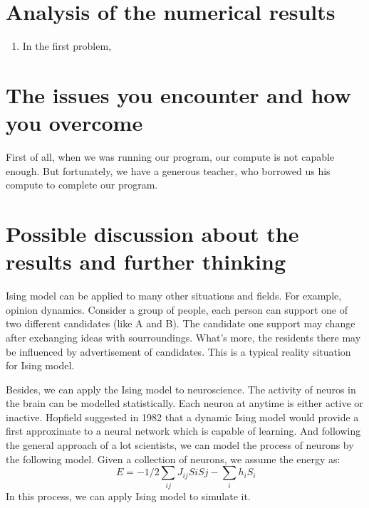\documentclass[11pt,openany]{book}              %
\begin{document}
\section{Analysis of the numerical results }
\begin{enumerate}
  \item In the first problem,
\end{enumerate}
\section{The issues you encounter and how you overcome }
First of all, when we was running our program, our compute is not capable enough. But fortunately, 
we have a generous teacher, who borrowed us his compute to complete our program.

\section{ Possible discussion about the results and further thinking }
Ising model can be applied to many other situations and fields. For example, opinion dynamics.
Consider a group of people, each person can support one of two different candidates (like A and B).
The candidate one support may change after exchanging ideas with sourroundings. 
What's more, the residents there may be influenced by advertisement of candidates. This is a typical
reality situation for Ising model.

Besides, we can apply the Ising model to neuroscience. The activity of neuros in the brain can be 
modelled statistically. Each neuron at anytime is either active or inactive. Hopfield suggested in 1982
that a dynamic Ising model would provide a first approximate to a neural network which is capable of learning.
And following the general approach of a lot scientists, we can model the process of neurons by the following 
model. Given a collection of neurons, we assume the energy as:
\begin{equation}
\, E = -1/2 \sum_{ij}J_{ij}SiSj-\sum_i h_iS_i
\end{equation}
In this process, we can apply Ising model to simulate it. 


%
%
\end{document}
